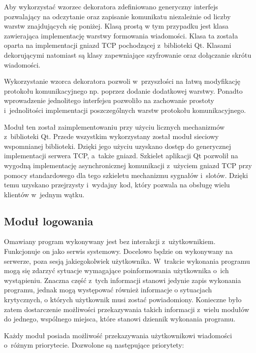Aby wykorzystać wzorzec dekoratora zdefiniowano generyczny interfejs
pozwalający na odczytanie oraz zapisanie komunikatu niezależnie od
liczby warstw znajdujących się poniżej. Klasą prostą w tym przypadku
jest klasa zawierająca implementację warstwy formowania
wiadomości. Klasa ta została oparta na implementacji gniazd TCP
pochodzącej z~biblioteki Qt. Klasami dekorującymi natomiast są klasy
zapewniające szyfrowanie oraz dołączanie skrótu wiadomości.


Wykorzystanie wzorca dekoratora pozwoli w~przyszłości na łatwą
modyfikację protokołu komunikacyjnego np. poprzez dodanie dodatkowej
warstwy. Ponadto wprowadzenie jednolitego interfejsu pozwoliło na
zachowanie prostoty i~jednolitości implementacji poszczególnych warstw
protokołu komunikacyjnego.

Moduł ten został zaimplementowaniu przy użyciu licznych mechanizmów
z~biblioteki Qt. Przede wszystkim wykorzystany został moduł sieciowy
wspomnianej biblioteki. Dzięki jego użyciu uzyskano dostęp do
generycznej implementacji serwera TCP, a~także gniazd. Szkielet
aplikacji Qt pozwolił na wygodną implementację asynchronicznej
komunikacji z~użyciem gniazd TCP przy pomocy standardowego dla tego
szkieletu mechanizmu sygnałów i~slotów. Dzięki temu uzyskano
przejrzysty i~wydajny kod, który pozwala na obsługę wielu klientów
w~jednym wątku.

\subsection[Moduł logowania][Moduł logowania]{Moduł logowania}

Omawiany program wykonywany jest bez interakcji
z~użytkownikiem. Funkcjonuje on jako serwis systemowy. Docelowo będzie
on wykonywany na serwerze, poza sesją jakiegokolwiek
użytkownika. W~trakcie wykonania programu mogą się zdarzyć sytuacje
wymagające poinformowania użytkownika o~ich wystąpieniu. Znaczna część
z~tych informacji stanowi jedynie zapis wykonania programu, jednak
mogą występować również informacje o sytuacjach krytycznych, o których
użytkownik musi zostać powiadomiony. Konieczne było zatem dostarczenie
możliwości przekazywania takich informacji z~wielu modułów do jednego,
wspólnego miejsca, które stanowi dziennik wykonania programu.

Każdy moduł posiada możliwość przekazywania użytkownikowi wiadomości
o~różnym priorytecie. Dozwolone są następujące priorytety:

